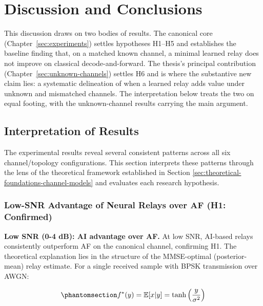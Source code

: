 \chapter{Discussion and Conclusions}\label{sec:discussion-and-conclusions}

This discussion draws on two bodies of results. The canonical core (Chapter~\ref{sec:experiments}) settles hypotheses H1--H5 and establishes the baseline finding that, on a matched known channel, a minimal learned relay does not improve on classical decode-and-forward. The thesis's principal contribution (Chapter~\ref{sec:unknown-channels}) settles H6 and is where the substantive new claim lies: a systematic delineation of when a learned relay adds value under unknown and mismatched channels. The interpretation below treats the two on equal footing, with the unknown-channel results carrying the main argument.

\section{Interpretation of Results}\label{sec:interpretation-of-results}

The experimental results reveal several consistent patterns across all six channel/topology configurations. This section interprets these patterns through the lens of the theoretical framework established in Section \ref{sec:theoretical-foundations-channel-models}  and evaluates each research hypothesis.

\subsection{Low-SNR Advantage of Neural Relays over AF (H1: Confirmed)}\label{sec:selective-low-snr-advantage-of-neural-relays-h1-partially-confirmed}

\textbf{Low SNR (0-4 dB): AI advantage over AF.} At low SNR, AI-based relays consistently outperform AF on the canonical channel, confirming H1. The theoretical explanation lies in the structure of the MMSE-optimal (posterior-mean) relay estimate. For a single received sample with BPSK transmission over AWGN:

\begin{equation}\protect\phantomsection\label{eq:optimal-denoiser-relay}{f^*(y) = \mathbb{E}[x | y] = \tanh\left(\frac{y}{\sigma^2}\right)
}\end{equation}


